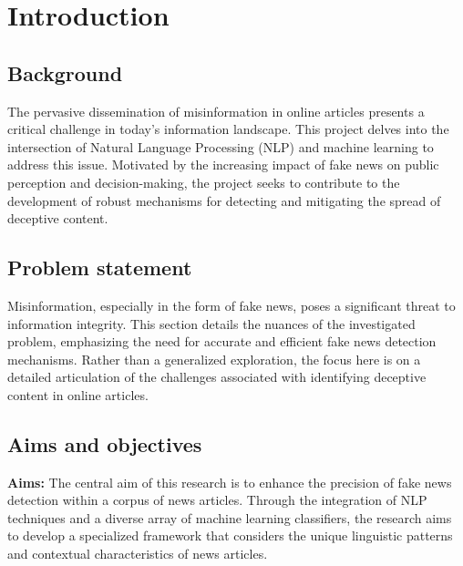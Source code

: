 \chapter{Introduction}
\label{ch:into} %



\section{Background}
\label{sec:into_back}
The pervasive dissemination of misinformation in online articles presents a critical challenge 
in today's information landscape. This project delves into the intersection of Natural Language 
Processing (NLP) and machine learning to address this issue. Motivated by the increasing impact 
of fake news on public perception and decision-making, the project seeks to contribute to the 
development of robust mechanisms for detecting and mitigating the spread of deceptive content. 

\section{Problem statement}
\label{sec:intro_prob_art}
Misinformation, especially in the form of fake news, poses a significant threat to information 
integrity. This section details the nuances of the investigated problem, emphasizing the need 
for accurate and efficient fake news detection mechanisms. Rather than a generalized 
exploration, the focus here is on a detailed articulation of the challenges associated with 
identifying deceptive content in online articles. 

\section{Aims and objectives}
\label{sec:intro_aims_obj}
\textbf{Aims:} The central aim of this research is to enhance the precision of fake news detection within a corpus of news articles. Through the integration of NLP techniques and a diverse array of machine learning classifiers, the research aims to develop a specialized framework that considers the unique linguistic patterns and contextual characteristics of news articles. 

